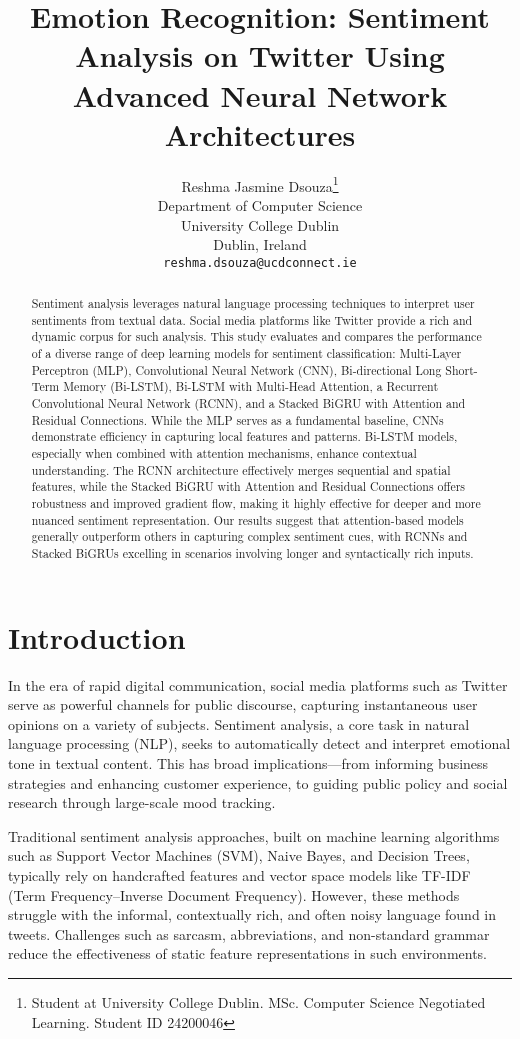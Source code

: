 \documentclass{article}
\title{Emotion Recognition: Sentiment Analysis on Twitter Using Advanced Neural Network Architectures}
\author{%
  Reshma Jasmine Dsouza\thanks{Student at University College Dublin. MSc. Computer Science Negotiated Learning. Student ID 24200046} \\
  Department of Computer Science\\
  University College Dublin\\
  Dublin, Ireland \\
  \texttt{reshma.dsouza@ucdconnect.ie} \\
}
\begin{document}
\maketitle

\begin{abstract}
Sentiment analysis leverages natural language processing techniques to interpret user sentiments from textual data. Social media platforms like Twitter provide a rich and dynamic corpus for such analysis. This study evaluates and compares the performance of a diverse range of deep learning models for sentiment classification: Multi-Layer Perceptron (MLP), Convolutional Neural Network (CNN), Bi-directional Long Short-Term Memory (Bi-LSTM), Bi-LSTM with Multi-Head Attention, a Recurrent Convolutional Neural Network (RCNN), and a Stacked BiGRU with Attention and Residual Connections. While the MLP serves as a fundamental baseline, CNNs demonstrate efficiency in capturing local features and patterns. Bi-LSTM models, especially when combined with attention mechanisms, enhance contextual understanding. The RCNN architecture effectively merges sequential and spatial features, while the Stacked BiGRU with Attention and Residual Connections offers robustness and improved gradient flow, making it highly effective for deeper and more nuanced sentiment representation. Our results suggest that attention-based models generally outperform others in capturing complex sentiment cues, with RCNNs and Stacked BiGRUs excelling in scenarios involving longer and syntactically rich inputs.
\end{abstract}

\section{Introduction}

In the era of rapid digital communication, social media platforms such as Twitter serve as powerful channels for public discourse, capturing instantaneous user opinions on a variety of subjects. Sentiment analysis, a core task in natural language processing (NLP), seeks to automatically detect and interpret emotional tone in textual content. This has broad implications—from informing business strategies and enhancing customer experience, to guiding public policy and social research through large-scale mood tracking.

Traditional sentiment analysis approaches, built on machine learning algorithms such as Support Vector Machines (SVM), Naive Bayes, and Decision Trees, typically rely on handcrafted features and vector space models like TF-IDF (Term Frequency–Inverse Document Frequency). However, these methods struggle with the informal, contextually rich, and often noisy language found in tweets. Challenges such as sarcasm, abbreviations, and non-standard grammar reduce the effectiveness of static feature representations in such environments.
\end{document}

